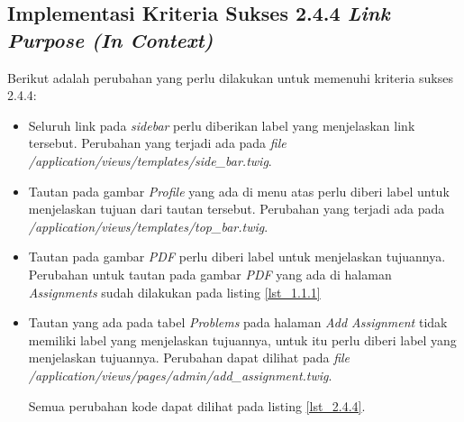 \subsection{Implementasi Kriteria Sukses 2.4.4 \textit{Link Purpose (In Context)}}
\label{subsec:implementasi_A_2.4.4}

Berikut adalah perubahan yang perlu dilakukan untuk memenuhi kriteria sukses 2.4.4:

\begin{itemize}
	\item Seluruh link pada \textit{sidebar} perlu diberikan label yang menjelaskan link tersebut. Perubahan yang terjadi ada pada \textit{file} \textit{/application/views/templates/side\_bar.twig}.

	\item Tautan pada gambar \textit{Profile} yang ada di menu atas perlu diberi label untuk menjelaskan tujuan dari tautan tersebut. Perubahan yang terjadi ada pada \textit{/application/views/templates/top\_bar.twig}.

	\item Tautan pada gambar \textit{PDF} perlu diberi label untuk menjelaskan tujuannya. Perubahan untuk tautan pada gambar \textit{PDF} yang ada di halaman \textit{Assignments} sudah dilakukan pada listing \ref{lst_1.1.1}
	
	\item Tautan yang ada pada tabel \textit{Problems} pada halaman \textit{Add Assignment} tidak memiliki label yang menjelaskan tujuannya, untuk itu perlu diberi label yang menjelaskan tujuannya. Perubahan dapat dilihat pada \textit{file} \textit{/application/views/pages/admin/add\_assignment.twig}.
	
	Semua perubahan kode dapat dilihat pada listing \ref{lst_2.4.4}.
	

\end{itemize}
